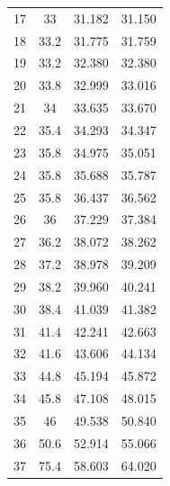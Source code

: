 \begin{table}[H]
\begin{tabular}{cccc}
    17         & 33                        & 31.182                & 31.150                 \\
    18         & 33.2                      & 31.775                & 31.759                 \\
    19         & 33.2                      & 32.380                & 32.380                 \\
    20         & 33.8                      & 32.999                & 33.016                 \\
    21         & 34                        & 33.635                & 33.670                 \\
    22         & 35.4                      & 34.293                & 34.347                 \\
    23         & 35.8                      & 34.975                & 35.051                 \\
    24         & 35.8                      & 35.688                & 35.787                 \\
    25         & 35.8                      & 36.437                & 36.562                 \\
    26         & 36                        & 37.229                & 37.384                 \\
    27         & 36.2                      & 38.072                & 38.262                 \\
    28         & 37.2                      & 38.978                & 39.209                 \\
    29         & 38.2                      & 39.960                & 40.241                 \\
    30         & 38.4                      & 41.039                & 41.382                 \\
    31         & 41.4                      & 42.241                & 42.663                 \\
    32         & 41.6                      & 43.606                & 44.134                 \\
    33         & 44.8                      & 45.194                & 45.872                 \\
    34         & 45.8                      & 47.108                & 48.015                 \\
    35         & 46                        & 49.538                & 50.840                 \\
    36         & 50.6                      & 52.914                & 55.066                 \\
    37         & 75.4                      & 58.603                & 64.020                
    \end{tabular}
    \end{table}

